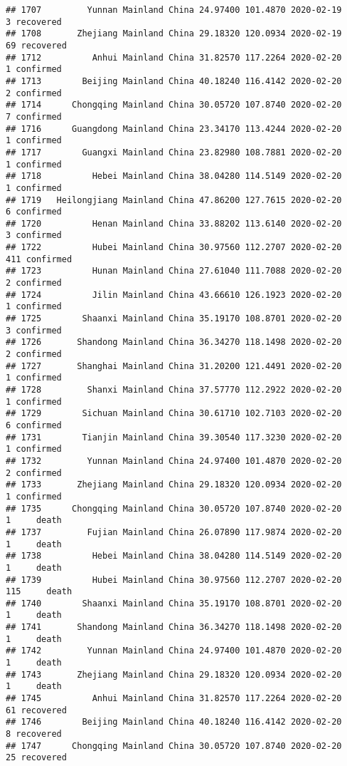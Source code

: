 \documentclass[
]{article}
\begin{document}
\begin{verbatim}
## 1707         Yunnan Mainland China 24.97400 101.4870 2020-02-19     3 recovered
## 1708       Zhejiang Mainland China 29.18320 120.0934 2020-02-19    69 recovered
## 1712          Anhui Mainland China 31.82570 117.2264 2020-02-20     1 confirmed
## 1713        Beijing Mainland China 40.18240 116.4142 2020-02-20     2 confirmed
## 1714      Chongqing Mainland China 30.05720 107.8740 2020-02-20     7 confirmed
## 1716      Guangdong Mainland China 23.34170 113.4244 2020-02-20     1 confirmed
## 1717        Guangxi Mainland China 23.82980 108.7881 2020-02-20     1 confirmed
## 1718          Hebei Mainland China 38.04280 114.5149 2020-02-20     1 confirmed
## 1719   Heilongjiang Mainland China 47.86200 127.7615 2020-02-20     6 confirmed
## 1720          Henan Mainland China 33.88202 113.6140 2020-02-20     3 confirmed
## 1722          Hubei Mainland China 30.97560 112.2707 2020-02-20   411 confirmed
## 1723          Hunan Mainland China 27.61040 111.7088 2020-02-20     2 confirmed
## 1724          Jilin Mainland China 43.66610 126.1923 2020-02-20     1 confirmed
## 1725        Shaanxi Mainland China 35.19170 108.8701 2020-02-20     3 confirmed
## 1726       Shandong Mainland China 36.34270 118.1498 2020-02-20     2 confirmed
## 1727       Shanghai Mainland China 31.20200 121.4491 2020-02-20     1 confirmed
## 1728         Shanxi Mainland China 37.57770 112.2922 2020-02-20     1 confirmed
## 1729        Sichuan Mainland China 30.61710 102.7103 2020-02-20     6 confirmed
## 1731        Tianjin Mainland China 39.30540 117.3230 2020-02-20     1 confirmed
## 1732         Yunnan Mainland China 24.97400 101.4870 2020-02-20     2 confirmed
## 1733       Zhejiang Mainland China 29.18320 120.0934 2020-02-20     1 confirmed
## 1735      Chongqing Mainland China 30.05720 107.8740 2020-02-20     1     death
## 1737         Fujian Mainland China 26.07890 117.9874 2020-02-20     1     death
## 1738          Hebei Mainland China 38.04280 114.5149 2020-02-20     1     death
## 1739          Hubei Mainland China 30.97560 112.2707 2020-02-20   115     death
## 1740        Shaanxi Mainland China 35.19170 108.8701 2020-02-20     1     death
## 1741       Shandong Mainland China 36.34270 118.1498 2020-02-20     1     death
## 1742         Yunnan Mainland China 24.97400 101.4870 2020-02-20     1     death
## 1743       Zhejiang Mainland China 29.18320 120.0934 2020-02-20     1     death
## 1745          Anhui Mainland China 31.82570 117.2264 2020-02-20    61 recovered
## 1746        Beijing Mainland China 40.18240 116.4142 2020-02-20     8 recovered
## 1747      Chongqing Mainland China 30.05720 107.8740 2020-02-20    25 recovered

\end{verbatim}
\end{document}
